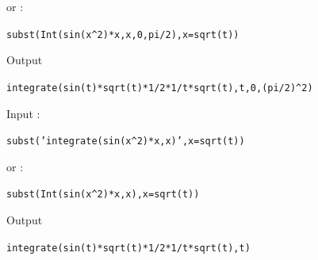 \documentclass[a4paper,11pt]{book}
\begin{document}
or :
\begin{center}{\tt subst(Int(sin(x\verb|^|2)*x,x,0,pi/2),x=sqrt(t))}\end{center}
Output
\begin{center}{\tt integrate(sin(t)*sqrt(t)*1/2*1/t*sqrt(t),t,0,(pi/2)\verb|^|2)}\end{center} 
Input :
\begin{center}{\tt subst('integrate(sin(x\verb|^|2)*x,x)',x=sqrt(t))}\end{center}
or :
\begin{center}{\tt subst(Int(sin(x\verb|^|2)*x,x),x=sqrt(t))}\end{center}
Output
\begin{center}{\tt integrate(sin(t)*sqrt(t)*1/2*1/t*sqrt(t),t)}\end{center} 
\end{document}
